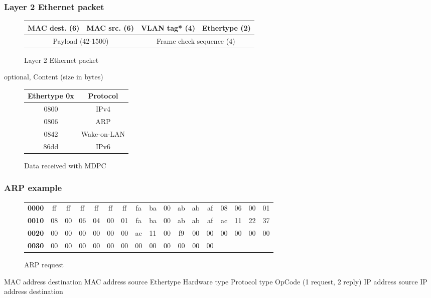   \begin{frame}
    \frametitle{Layer 2 Ethernet packet}
      \begin{figure}[h]
      \centering
      \begin{tabular}{|c|c|c|c|c|c|c|c|c|}
        \hline
        \multicolumn{3}{|c|}{MAC dest. (\color{blue}6\color{black})} & \multicolumn{3}{|c|}{MAC src. (\color{blue}6\color{black})} & \multicolumn{2}{|c|}{\color{brown}VLAN tag* (\color{blue}4\color{brown})\color{black}} & Ethertype (\color{blue}2\color{black}) \\ \hline
        \multicolumn{6}{|c|}{Payload (\color{blue}42-1500\color{black})} & \multicolumn{3}{|c|}{Frame check sequence (\color{blue}4\color{black})}\\ \hline
      \end{tabular}
      \caption{Layer 2 Ethernet packet}
      \label{fig:eth_packet}
    \end{figure}
    \hfill \color{brown}optional\color{black}, Content (\color{blue}size in bytes\color{black})
    \begin{figure}[h]
      \centering
      \begin{tabular}{|c|c|}
        \hline
        \textbf{Ethertype 0x} & \textbf{Protocol} \\ \hline
        0800 & IPv4 \\ \hline
        0806 & ARP \\ \hline
        0842 & Wake-on-LAN \\ \hline
        86dd & IPv6 \\ \hline
      \end{tabular}
      \caption{Data received with MDPC}
      \label{fig:eth_type}
    \end{figure}
  \end{frame}


  \begin{frame}
    \frametitle{ARP example}
      \begin{figure}
      \centering
      \resizebox{11.5cm}{!} {
        \begin{tabular}{lcccccccccccccccc}
          \textbf{0000} & ff & ff & ff & ff & ff & ff & fa & ba & 00 & ab & ab & af & 08 & 06 & 00 & 01 \\
          \textbf{0010} & 08 & 00 & 06 & 04 & 00 & 01 & fa & ba & 00 & ab & ab & af & ac & 11 & 22 & 37 \\
          \textbf{0020} & 00 & 00 & 00 & 00 & 00 & 00 & ac & 11 & 00 & f9 & 00 & 00 & 00 & 00 & 00 & 00 \\
          \textbf{0030} & 00 & 00 & 00 & 00 & 00 & 00 & 00 & 00 & 00 & 00 & 00 & 00 \\
        \end{tabular}
      }
      \caption{ARP request}
      \label{fig:arp_packet_ex}
    \end{figure}
        MAC address destination MAC address source Ethertype Hardware type Protocol type OpCode (1 request, 2 reply) IP address source IP address destination
  \end{frame}

